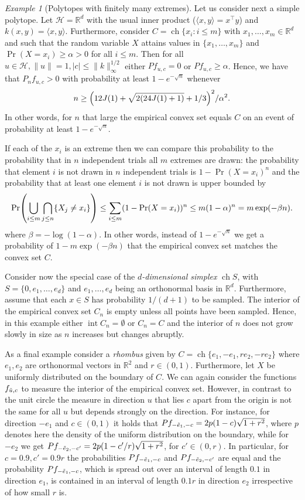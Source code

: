 \documentclass[10pt]{amsart}
\theoremstyle{definition}\newtheorem{defi}[theo]{Definition}\newtheorem{rema}[theo]{Remark}\newtheorem{exam}[theo]{Example}\newtheorem{exem}[theo]{Example}\newtheorem{nota}[theo]{Notation}
\theoremstyle{remark}
\newtheorem{examl}{Example}
\DeclareMathOperator{\ch}{ch}
\DeclareMathOperator{\intr}{int}
\newcommand{\R}{\mathbb{R}}
\newcommand{\cH}{\mathcal{H}}
\let\oldtilde\tilde
\renewcommand*{\tilde}[1]{\mathchoice{\widetilde{#1}}{\widetilde{#1}}{\oldtilde{#1}}{\oldtilde{#1}}}
\let\originalleft\left
\let\originalright\right
\renewcommand{\left}{\mathopen{}\mathclose\bgroup\originalleft}
\renewcommand{\right}{\aftergroup\egroup\originalright}
\begin{document}
\begin{examl}[{Polytopes with finitely many extremes}]
Let us consider next a simple polytope. Let $\cH = \R^d$ with the usual inner product ($\langle x,y \rangle = x^\top y$) and $k(x,y) = \langle x,y \rangle$. Furthermore, consider $C = \ch\{x_i : i \leq m \} $ with $x_1,\dots, x_m \in \R^d$ and such that the random variable $X$ attains values in $\{x_1, \dots, x_m\}$ and $\Pr(X = x_i) \geq \alpha > 0$ for all $i\leq m$. Then for all $u\in \cH, \|u\| =1, |c| \leq \|k\|_\infty^{1/2}$ either $P f_{u,c} =0$ or $P f_{u,c}
\geq \alpha$. Hence, we have that $P_n f_{u,c} > 0$ with probability at least $1-e^{-\sqrt{n}}$ whenever
\[
n \geq \left(12 J(1) + \sqrt{2(24 J(1) + 1)} +1/3\right)^2/\alpha^2.
\]
In other words, for $n$ that large the empirical convex set equals $C$ on an event of probability at least $1-e^{-\sqrt{n}}$.

If each of the $x_i$ is an extreme then we can compare this probability to the probability that in $n$ independent trials all $m$ extremes are drawn: the probability that element $i$ is not drawn in $n$ independent trials is $1-\Pr(X=x_i)^n$ and the probability that at least one element $i$ is not drawn is upper bounded by
\[
\Pr\left(\bigcup_{i \leq m} \bigcap_{j\leq n} \{X_j \not = x_i\}\right) \leq \sum_{i \leq m} (1-\Pr(X=x_i))^n \leq m (1-\alpha)^n = m \exp(- \beta n).
\]
where $\beta = -\log(1-\alpha)$. In other words, instead of $1-e^{-\sqrt{n}}$ we get a probability of $1-m \exp(-\beta n)$ that the empirical convex set matches the convex set $C$.

Consider now the special case of the \emph{$d$-dimensional simplex} $\ch S$, with $S = \{0,e_1,\dots,e_d\}$ and $e_1,\dots, e_d$ being an orthonormal basis in $\R^d$. Furthermore, assume that each $x \in S$ has probability $1/(d +1)$ to be sampled. The interior of the empirical convex set $C_n$ is empty unless all points have been sampled. Hence, in this example either $\intr C_n = \emptyset$ or $C_n = C$ and the interior of $n$ does not grow slowly in size as $n$ increases but changes abruptly.

As a final example consider a \emph{rhombus} given by $C = \ch \{e_1,-e_1, r e_2, -r e_2\}$ where $e_1,e_2$ are orthonormal vectors in $\R^2$ and $r \in (0,1)$. Furthermore, let $X$ be uniformly distributed on the boundary of $C$. We can again consider the functions $f_{\tilde u,c}$ to measure the interior of the empirical convex set. However, in contrast to the unit circle the measure in direction $u$ that lies $c$ apart from the origin is not the same for all $u$ but depends strongly on the direction. For instance, for direction $ -e_1$ and $c \in (0,1)$ it holds that $P f_{-\tilde{e}_1,-c} = 2 p (1-c)\sqrt{1+r^2}$, where $p$ denotes here the density of the uniform distribution on the boundary, while for $-e_2$ we get $Pf_{-\tilde{e}_2,-c'} = 2p(1-c'/r) \sqrt{1+r^2}$, for $c' \in (0,r)$. In particular, for $c = 0.9, c'=0.9 r$ the probabilities $P f_{-\tilde{e}_1,-c}$ and $Pf_{-\tilde{e}_2,-c'}$ are equal and the probability $P f_{-\tilde{e}_1,-c}$, which is spread out over an interval of length $0.1$ in direction $e_1$, is contained in an interval of length $0.1 r$ in direction $e_2$ irrespective of how small $r$ is.


\end{examl}
\end{document}
